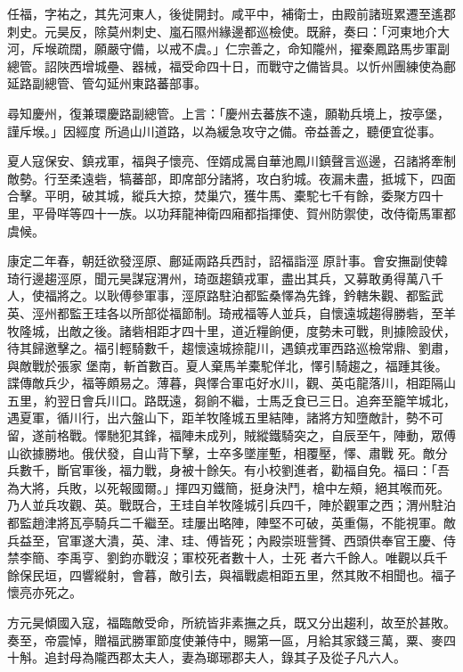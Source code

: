 \begin{pinyinscope}
 任福，字祐之，其先河東人，後徙開封。咸平中，補衛士，由殿前諸班累遷至遙郡刺史。元昊反，除莫州刺史、嵐石隰州緣邊都巡檢使。既辭，奏曰：「河東地介大河，斥堠疏闊，願嚴守備，以戒不虞。」仁宗善之，命知隴州，擢秦鳳路馬步軍副總管。詔陜西增城壘、器械，福受命四十日，而戰守之備皆具。以忻州團練使為鄜延路副總管、管勾延州東路蕃部事。



 尋知慶州，復兼環慶路副總管。上言：「慶州去蕃族不遠，願勒兵境上，按亭堡，謹斥堠。」因經度
 所過山川道路，以為緩急攻守之備。帝益善之，聽便宜從事。



 夏人寇保安、鎮戎軍，福與子懷亮、侄婿成暠自華池鳳川鎮聲言巡邊，召諸將牽制敵勢。行至柔遠砦，犒蕃部，即席部分諸將，攻白豹城。夜漏未盡，抵城下，四面合擊。平明，破其城，縱兵大掠，焚巢穴，獲牛馬、橐駝七千有餘，委聚方四十里，平骨咩等四十一族。以功拜龍神衛四廂都指揮使、賀州防禦使，改侍衛馬軍都虞候。



 康定二年春，朝廷欲發涇原、鄜延兩路兵西討，詔福詣涇
 原計事。會安撫副使韓琦行邊趨涇原，聞元昊謀寇渭州，琦亟趨鎮戎軍，盡出其兵，又募敢勇得萬八千人，使福將之。以耿傅參軍事，涇原路駐泊都監桑懌為先鋒，鈐轄朱觀、都監武英、涇州都監王珪各以所部從福節制。琦戒福等人並兵，自懷遠城趨得勝砦，至羊牧隆城，出敵之後。諸砦相距才四十里，道近糧餉便，度勢未可戰，則據險設伏，待其歸邀擊之。福引輕騎數千，趨懷遠城捺龍川，遇鎮戎軍西路巡檢常鼎、劉肅，與敵戰於張家
 堡南，斬首數百。夏人棄馬羊橐駝佯北，懌引騎趨之，福踵其後。諜傳敵兵少，福等頗易之。薄暮，與懌合軍屯好水川，觀、英屯龍落川，相距隔山五里，約翌日會兵川口。路既遠，芻餉不繼，士馬乏食已三日。追奔至籠竿城北，遇夏軍，循川行，出六盤山下，距羊牧隆城五里結陣，諸將方知墮敵計，勢不可留，遂前格戰。懌馳犯其鋒，福陣未成列，賊縱鐵騎突之，自辰至午，陣動，眾傅山欲據勝地。俄伏發，自山背下擊，士卒多墜崖塹，相覆壓，懌、肅戰
 死。敵分兵數千，斷官軍後，福力戰，身被十餘矢。有小校劉進者，勸福自免。福曰：「吾為大將，兵敗，以死報國爾。」揮四刃鐵簡，挺身決鬥，槍中左頰，絕其喉而死。乃人並兵攻觀、英。戰既合，王珪自羊牧隆城引兵四千，陣於觀軍之西；渭州駐泊都監趙津將瓦亭騎兵二千繼至。珪屢出略陣，陣堅不可破，英重傷，不能視軍。敵兵益至，官軍遂大潰，英、津、珪、傅皆死；內殿崇班訾贇、西頭供奉官王慶、侍禁李簡、李禹亨、劉鈞亦戰沒；軍校死者數十人，士死
 者六千餘人。唯觀以兵千餘保民垣，四響縱射，會暮，敵引去，與福戰處相距五里，然其敗不相聞也。福子懷亮亦死之。



 方元昊傾國入寇，福臨敵受命，所統皆非素撫之兵，既又分出趨利，故至於甚敗。奏至，帝震悼，贈福武勝軍節度使兼侍中，賜第一區，月給其家錢三萬，粟、麥四十斛。追封母為隴西郡太夫人，妻為瑯琊郡夫人，錄其子及從子凡六人。




\end{pinyinscope}
